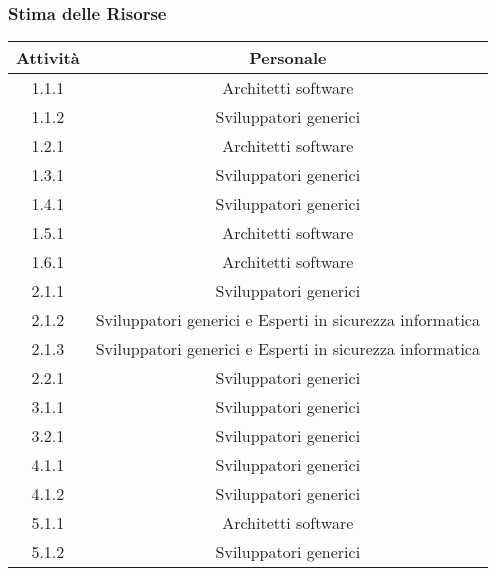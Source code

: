 \subsubsection{Stima delle Risorse}
\begin{table}[h]
    \centering
    \begin{tabular}{|c|c|}
        \hline
        \textbf{Attività} & \textbf{Personale}                                       \\
        \hline
        1.1.1             & Architetti software                                      \\
        1.1.2             & Sviluppatori generici                                    \\
        1.2.1             & Architetti software                                      \\
        1.3.1             & Sviluppatori generici                                    \\
        1.4.1             & Sviluppatori generici                                    \\
        1.5.1             & Architetti software                                      \\
        1.6.1             & Architetti software                                      \\
        2.1.1             & Sviluppatori generici                                    \\
        2.1.2             & Sviluppatori generici e Esperti in sicurezza informatica \\
        2.1.3             & Sviluppatori generici e Esperti in sicurezza informatica \\
        2.2.1             & Sviluppatori generici                                    \\
        3.1.1             & Sviluppatori generici                                    \\
        3.2.1             & Sviluppatori generici                                    \\
        4.1.1             & Sviluppatori generici                                    \\
        4.1.2             & Sviluppatori generici                                    \\
        5.1.1             & Architetti software                                      \\
        5.1.2             & Sviluppatori generici                                    \\

\end{tabular}
\end{table}
